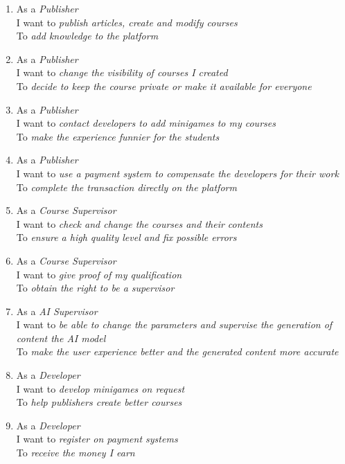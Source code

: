 \begin{enumerate}
	\item As a \textit{Publisher} \\
	I want to \textit{publish articles, create and modify courses} \\
	To \textit{add knowledge to the platform}
	\item As a \textit{Publisher} \\
	I want to \textit{change the visibility of courses I created} \\
	To \textit{decide to keep the course private or make it available for everyone}
	\item As a \textit{Publisher} \\
	I want to \textit{contact developers to add minigames to my courses} \\
	To \textit{make the experience funnier for the students}
	\item As a \textit{Publisher} \\
	I want to \textit{use a payment system to compensate the developers for their work} \\
	To \textit{complete the transaction directly on the platform}
	
	\item As a \textit{Course Supervisor} \\
	I want to \textit{check and change the courses and their contents} \\
	To \textit{ensure a high quality level and fix possible errors}
	\item As a \textit{Course Supervisor} \\
	I want to \textit{give proof of my qualification} \\
	To \textit{obtain the right to be a supervisor}
	
	\item As a \textit{AI Supervisor} \\
	I want to \textit{be able to change the parameters and supervise the generation of content the AI model} \\
	To \textit{make the user experience better and the generated content more accurate}
	
	\item As a \textit{Developer} \\
	I want to \textit{develop minigames on request} \\
	To \textit{help publishers create better courses}
	\item As a \textit{Developer} \\
	I want to \textit{register on payment systems} \\
	To \textit{receive the money I earn}
	

\end{enumerate}
